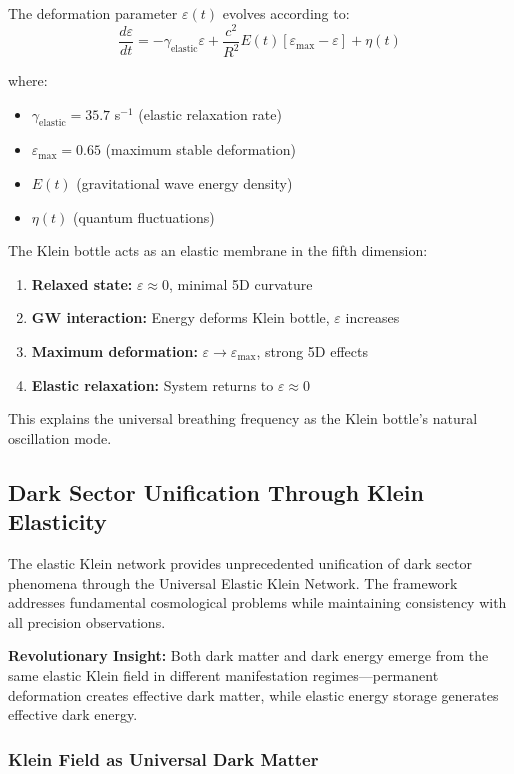 \documentclass[12pt]{iopart}
\begin{document}
The deformation parameter $\varepsilon(t)$ evolves according to:
\begin{equation}
\frac{d\varepsilon}{dt} = -\gamma_{\text{elastic}}\varepsilon + \frac{c^2}{R^2}E(t)[\varepsilon_{\max} - \varepsilon] + \eta(t)
\end{equation}

where:
\begin{itemize}
\item $\gamma_{\text{elastic}} = 35.7$ s$^{-1}$ (elastic relaxation rate)
\item $\varepsilon_{\max} = 0.65$ (maximum stable deformation)
\item $E(t)$ (gravitational wave energy density)
\item $\eta(t)$ (quantum fluctuations)
\end{itemize}

The Klein bottle acts as an elastic membrane in the fifth dimension:
\begin{enumerate}
\item \textbf{Relaxed state:} $\varepsilon \approx 0$, minimal 5D curvature
\item \textbf{GW interaction:} Energy deforms Klein bottle, $\varepsilon$ increases  
\item \textbf{Maximum deformation:} $\varepsilon \to \varepsilon_{\max}$, strong 5D effects
\item \textbf{Elastic relaxation:} System returns to $\varepsilon \approx 0$
\end{enumerate}

This explains the universal breathing frequency as the Klein bottle's natural oscillation mode.

\subsection{Dark Sector Unification Through Klein Elasticity}

The elastic Klein network provides unprecedented unification of dark sector phenomena through the Universal Elastic Klein Network. The framework addresses fundamental cosmological problems while maintaining consistency with all precision observations.

\textbf{Revolutionary Insight:} Both dark matter and dark energy emerge from the same elastic Klein field in different manifestation regimes—permanent deformation creates effective dark matter, while elastic energy storage generates effective dark energy.

\subsubsection{Klein Field as Universal Dark Matter}
\end{document}
